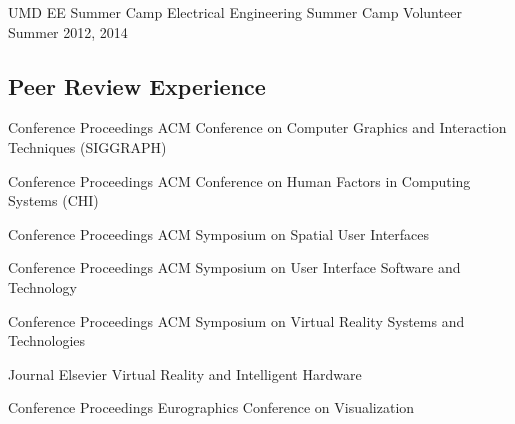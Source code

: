 \begin{cventries}
  \cventry
    {UMD EE Summer Camp} %
    {Electrical Engineering Summer Camp Volunteer} %
    {Summer 2012, 2014} %
    {} %
    {}
    \vspace{-0.15in}
    
    

  \vspace{-.25cm}
  \subsection*{Peer Review Experience}
  
  \cventry
    {Conference Proceedings} %
    {ACM Conference on Computer Graphics and Interaction Techniques (SIGGRAPH)} %
    {} %
    {} %
    {}
    \vspace{-0.15in}
  
  \cventry
    {Conference Proceedings} %
    {ACM Conference on Human Factors in Computing Systems (CHI)} %
    {} %
    {} %
    {}
    \vspace{-0.15in}
    
  \cventry
    {Conference Proceedings} %
    {ACM Symposium on Spatial User Interfaces} %
    {} %
    {} %
    {}
    \vspace{-0.15in}
    
  \cventry
    {Conference Proceedings} %
    {ACM Symposium on User Interface Software and Technology} %
    {} %
    {} %
    {}
    \vspace{-0.15in}
    
  \cventry
    {Conference Proceedings} %
    {ACM Symposium on Virtual Reality Systems and Technologies} %
    {} %
    {} %
    {}
    \vspace{-0.15in}
    
  \cventry
    {Journal} %
    {Elsevier Virtual Reality and Intelligent Hardware} %
    {} %
    {} %
    {}
    \vspace{-0.15in}
    
  \cventry
    {Conference Proceedings} %
    {Eurographics Conference on Visualization} %
    {} %
    {} %
    {}
    \vspace{-0.15in}
    

\end{cventries}
